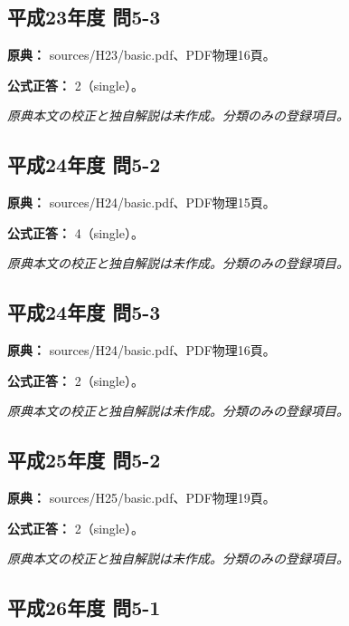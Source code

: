 \subsection{平成23年度 問5-3}
\label{q:h23-reg-basic-5-3}

\noindent\textbf{原典：} sources/H23/basic.pdf、PDF物理16頁。

\textbf{公式正答：} 2（single）。

\par\textit{原典本文の校正と独自解説は未作成。分類のみの登録項目。}

\subsection{平成24年度 問5-2}
\label{q:h24-reg-basic-5-2}

\noindent\textbf{原典：} sources/H24/basic.pdf、PDF物理15頁。

\textbf{公式正答：} 4（single）。

\par\textit{原典本文の校正と独自解説は未作成。分類のみの登録項目。}

\subsection{平成24年度 問5-3}
\label{q:h24-reg-basic-5-3}

\noindent\textbf{原典：} sources/H24/basic.pdf、PDF物理16頁。

\textbf{公式正答：} 2（single）。

\par\textit{原典本文の校正と独自解説は未作成。分類のみの登録項目。}

\subsection{平成25年度 問5-2}
\label{q:h25-reg-basic-5-2}

\noindent\textbf{原典：} sources/H25/basic.pdf、PDF物理19頁。

\textbf{公式正答：} 2（single）。

\par\textit{原典本文の校正と独自解説は未作成。分類のみの登録項目。}

\subsection{平成26年度 問5-1}
\label{q:h26-reg-basic-5-1}

